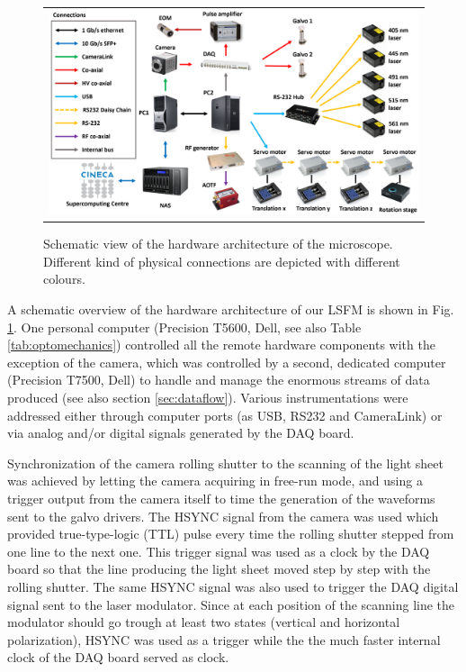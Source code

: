 \documentclass[12pt]{spieman}  %
\begin{document}
\begin{spacing}{2}
	\begin{figure}
   \begin{center}
   \begin{tabular}{c}
   \includegraphics[width=\textwidth]{frame4.eps}
   \end{tabular}
   \end{center}
   \caption{\label{fig:connectivity} Schematic view of the hardware architecture of the microscope. Different kind of physical connections are depicted with different colours.} 
   \end{figure}

A schematic overview of the hardware architecture of our LSFM is shown in Fig. \ref{fig:connectivity}. One personal computer (Precision T5600, Dell, see also Table \ref{tab:optomechanics}) controlled all the remote hardware components with the exception of the camera, which was controlled by a second, dedicated computer (Precision T7500, Dell) to handle and manage the enormous streams of data produced (see also section \ref{sec:dataflow}). Various instrumentations were addressed either through computer ports (as USB, RS232 and CameraLink) or via analog and/or digital signals generated by the DAQ board.

Synchronization of the camera rolling shutter to the scanning of the light sheet was achieved by letting the camera acquiring in free-run mode, and using a trigger output from the camera itself to time the generation of the waveforms sent to the galvo drivers. The HSYNC signal from the camera was used which provided true-type-logic (TTL) pulse every time the rolling shutter stepped from one line to the next one. This trigger signal was used as a clock by the DAQ board so that the line producing the light sheet moved step by step with the rolling shutter. The same HSYNC signal was also used to trigger the DAQ digital signal sent to the laser modulator. Since at each position of the scanning line the modulator should go trough at least two states (vertical and horizontal polarization), HSYNC was used as a trigger while the the much faster internal clock of the DAQ board served as clock.


\end{spacing}
\end{document}
